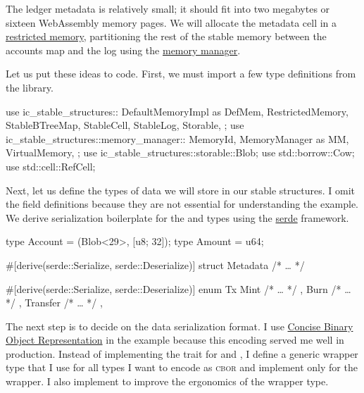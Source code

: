 \documentclass{article}
\begin{document}
The ledger metadata is relatively small; it should fit into two megabytes or sixteen WebAssembly memory pages.
We will allocate the metadata cell in a \href{#restricted-memory}{restricted memory}, partitioning the rest of the stable memory between the accounts map and the log using the \href{#memory-manager}{memory manager}.

Let us put these ideas to code.
First, we must import a few type definitions from the library.

\begin{code}[rust]
use ic_stable_structures::{
  DefaultMemoryImpl as DefMem,
  RestrictedMemory,
  StableBTreeMap,
  StableCell,
  StableLog,
  Storable,
};
use ic_stable_structures::memory_manager::{
  MemoryId,
  MemoryManager as MM,
  VirtualMemory,
};
use ic_stable_structures::storable::Blob;
use std::borrow::Cow;
use std::cell::RefCell;
\end{code}

Next, let us define the types of data we will store in our stable structures.
I omit the field definitions because they are not essential for understanding the example.
We derive serialization boilerplate for the  and  types using the \href{https://serde.rs/}{serde} framework.

\begin{code}[rust]
type Account = (Blob<29>, [u8; 32]);
type Amount = u64;

#[derive(serde::Serialize, serde::Deserialize)]
struct Metadata { /* … */ }

#[derive(serde::Serialize, serde::Deserialize)]
enum Tx {
  Mint { /* … */ },
  Burn { /* … */ },
  Transfer { /* … */ },
}
\end{code}

The next step is to decide on the data serialization format.
I use \href{https://cbor.io/}{Concise Binary Object Representation} in the example because this encoding served me well in production.
Instead of implementing the \href{#storable-trait}{} trait for  and , I define a generic wrapper type  that I use for all types I want to encode as \textsc{cbor} and implement \href{#storable-trait}{} only for the wrapper.
I also implement \href{https://doc.rust-lang.org/std/ops/trait.Deref.html}{} to improve the ergonomics of the wrapper type.
\end{document}

